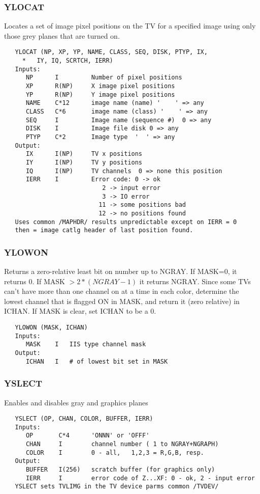 \subsubsection{YLOCAT}
Locates a set of image pixel positions on the TV for a
specified image using only those grey planes that are turned on.
\begin{verbatim}
   YLOCAT (NP, XP, YP, NAME, CLASS, SEQ, DISK, PTYP, IX,
     *   IY, IQ, SCRTCH, IERR)
   Inputs:
      NP      I         Number of pixel positions
      XP      R(NP)     X image pixel positions
      YP      R(NP)     Y image pixel positions
      NAME    C*12      image name (name) '    ' => any
      CLASS   C*6       image name (class) '    ' => any
      SEQ     I         Image name (sequence #)  0 => any
      DISK    I         Image file disk 0 => any
      PTYP    C*2       Image type  '  ' => any
   Output:
      IX      I(NP)     TV x positions
      IY      I(NP)     TV y positions
      IQ      I(NP)     TV channels  0 => none this position
      IERR    I         Error code: 0 -> ok
                           2 -> input error
                           3 -> IO error
                          11 -> some positions bad
                          12 -> no positions found
   Uses common /MAPHDR/ results unpredictable except on IERR = 0
   then = image catlg header of last position found.

\end{verbatim}

\subsubsection{YLOWON}
Returns a zero-relative least bit on number up to NGRAY.
If MASK=0, it returns 0.  If MASK $ > 2* (NGRAY-1)$ it returns NGRAY.
Since some TVs can't have more than one channel on at a time in
each color, determine the lowest channel that is flagged ON in MASK,
and return it (zero relative) in ICHAN.  If MASK is clear, set ICHAN
to be a 0.
\begin{verbatim}
   YLOWON (MASK, ICHAN)
   Inputs:
      MASK    I   IIS type channel mask
   Output:
      ICHAN   I   # of lowest bit set in MASK
\end{verbatim}

\subsubsection{YSLECT}
Enables and disables gray and graphics planes
\begin{verbatim}
   YSLECT (OP, CHAN, COLOR, BUFFER, IERR)
   Inputs:
      OP       C*4      'ONNN' or 'OFFF'
      CHAN     I        channel number ( 1 to NGRAY+NGRAPH)
      COLOR    I        0 - all,   1,2,3 = R,G,B, resp.
   Output:
      BUFFER   I(256)   scratch buffer (for graphics only)
      IERR     I        error code of Z...XF: 0 - ok, 2 - input error
   YSLECT sets TVLIMG in the TV device parms common /TVDEV/

\end{verbatim}

